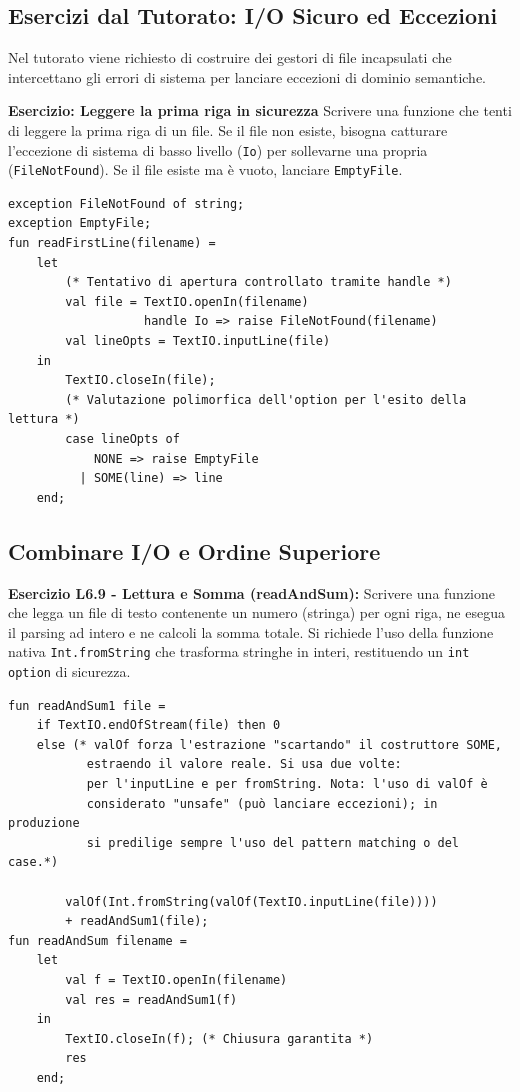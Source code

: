 \documentclass[12pt, a4paper]{article}
\begin{document}
\subsection{Esercizi dal Tutorato: I/O Sicuro ed Eccezioni}
Nel tutorato viene richiesto di costruire dei gestori di file incapsulati che intercettano gli errori di sistema per lanciare eccezioni di dominio semantiche. 

\textbf{Esercizio: Leggere la prima riga in sicurezza}
Scrivere una funzione che tenti di leggere la prima riga di un file. Se il file non esiste, bisogna catturare l'eccezione di sistema di basso livello (\texttt{Io}) per sollevarne una propria (\texttt{FileNotFound}). Se il file esiste ma è vuoto, lanciare \texttt{EmptyFile}.

\begin{verbatim}
exception FileNotFound of string;
exception EmptyFile;
fun readFirstLine(filename) =
    let 
        (* Tentativo di apertura controllato tramite handle *)
        val file = TextIO.openIn(filename) 
                   handle Io => raise FileNotFound(filename)
        val lineOpts = TextIO.inputLine(file)
    in
        TextIO.closeIn(file);
        (* Valutazione polimorfica dell'option per l'esito della lettura *)
        case lineOpts of
            NONE => raise EmptyFile
          | SOME(line) => line
    end;
\end{verbatim}

\subsection{Combinare I/O e Ordine Superiore}

\textbf{Esercizio L6.9 - Lettura e Somma (readAndSum):}
Scrivere una funzione che legga un file di testo contenente un numero (stringa) per ogni riga, ne esegua il parsing ad intero e ne calcoli la somma totale. Si richiede l'uso della funzione nativa \texttt{Int.fromString} che trasforma stringhe in interi, restituendo un \texttt{int option} di sicurezza.

\begin{verbatim}
fun readAndSum1 file =
    if TextIO.endOfStream(file) then 0
    else (* valOf forza l'estrazione "scartando" il costruttore SOME, 
           estraendo il valore reale. Si usa due volte: 
           per l'inputLine e per fromString. Nota: l'uso di valOf è 
           considerato "unsafe" (può lanciare eccezioni); in produzione 
           si predilige sempre l'uso del pattern matching o del case.*)
           
        valOf(Int.fromString(valOf(TextIO.inputLine(file)))) 
        + readAndSum1(file);
fun readAndSum filename =
    let
        val f = TextIO.openIn(filename)
        val res = readAndSum1(f)
    in
        TextIO.closeIn(f); (* Chiusura garantita *)
        res
    end;
\end{verbatim}
\end{document}
